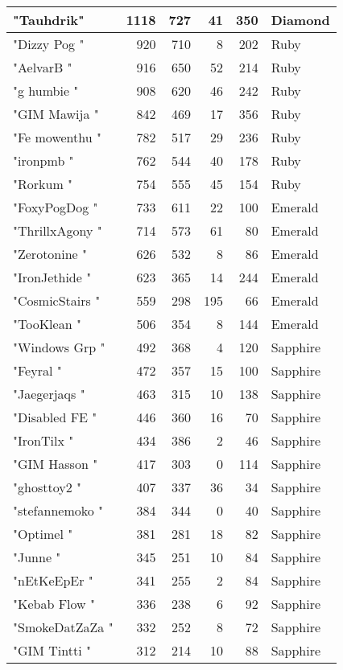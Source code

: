 \documentclass{article}
\begin{document}
\begin{table}[htbp]
\begin{tabular}{|l|r|r|r|r|l|}
"Tauhdrik" & 1118 & 727 & 41 & 350 & Diamond \\ \hline
"Dizzy Pog " & 920 & 710 & 8 & 202 & Ruby \\ \hline
"AelvarB " & 916 & 650 & 52 & 214 & Ruby \\ \hline
"g humbie " & 908 & 620 & 46 & 242 & Ruby \\ \hline
"GIM Mawija " & 842 & 469 & 17 & 356 & Ruby \\ \hline
"Fe mowenthu " & 782 & 517 & 29 & 236 & Ruby \\ \hline
"ironpmb " & 762 & 544 & 40 & 178 & Ruby \\ \hline
"Rorkum " & 754 & 555 & 45 & 154 & Ruby \\ \hline
"FoxyPogDog " & 733 & 611 & 22 & 100 & Emerald \\ \hline
"ThrillxAgony " & 714 & 573 & 61 & 80 & Emerald \\ \hline
"Zerotonine " & 626 & 532 & 8 & 86 & Emerald \\ \hline
"IronJethide " & 623 & 365 & 14 & 244 & Emerald \\ \hline
"CosmicStairs " & 559 & 298 & 195 & 66 & Emerald \\ \hline
"TooKlean " & 506 & 354 & 8 & 144 & Emerald \\ \hline
"Windows Grp " & 492 & 368 & 4 & 120 & Sapphire \\ \hline
"Feyral " & 472 & 357 & 15 & 100 & Sapphire \\ \hline
"Jaegerjaqs " & 463 & 315 & 10 & 138 & Sapphire \\ \hline
"Disabled FE " & 446 & 360 & 16 & 70 & Sapphire \\ \hline
"IronTilx " & 434 & 386 & 2 & 46 & Sapphire \\ \hline
"GIM Hasson " & 417 & 303 & 0 & 114 & Sapphire \\ \hline
"ghosttoy2 " & 407 & 337 & 36 & 34 & Sapphire \\ \hline
"stefannemoko " & 384 & 344 & 0 & 40 & Sapphire \\ \hline
"Optimel " & 381 & 281 & 18 & 82 & Sapphire \\ \hline
"Junne " & 345 & 251 & 10 & 84 & Sapphire \\ \hline
"nEtKeEpEr " & 341 & 255 & 2 & 84 & Sapphire \\ \hline
"Kebab Flow " & 336 & 238 & 6 & 92 & Sapphire \\ \hline
"SmokeDatZaZa " & 332 & 252 & 8 & 72 & Sapphire \\ \hline
"GIM Tintti " & 312 & 214 & 10 & 88 & Sapphire \\ \hline

\end{tabular}
\end{table}
\end{document}

